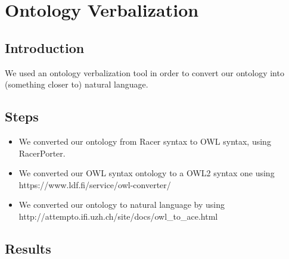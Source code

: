 \documentclass[a4paper,12pt]{report}
\begin{document}
\begin{center}
\end{center}


\chapter{Ontology Verbalization}
\section{Introduction}
We used an ontology verbalization tool in order to convert our ontology into (something closer to) natural language.

\section{Steps}
\begin{itemize}
    \item We converted our ontology from Racer syntax to OWL syntax, using RacerPorter.
    \item We converted our OWL syntax ontology to a OWL2 syntax one using https://www.ldf.fi/service/owl-converter/
    \item We converted our ontology to natural language by using http://attempto.ifi.uzh.ch/site/docs/owl\_to\_ace.html
    
\end{itemize}

\section{Results}
\end{document}
